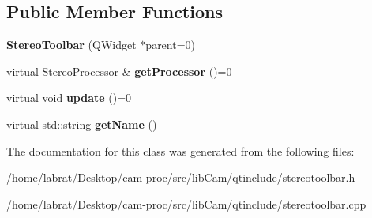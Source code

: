 \subsection*{Public Member Functions}
\begin{DoxyCompactItemize}
\item 
{\bfseries Stereo\+Toolbar} (Q\+Widget $\ast$parent=0)\hypertarget{classStereoToolbar_af6c618e6b46f1b8c743aa28cb2f89a55}{}\label{classStereoToolbar_af6c618e6b46f1b8c743aa28cb2f89a55}

\item 
virtual \hyperlink{classStereoProcessor}{Stereo\+Processor} \& {\bfseries get\+Processor} ()=0\hypertarget{classStereoToolbar_a46ac881df909595cc24beca9db9e0b47}{}\label{classStereoToolbar_a46ac881df909595cc24beca9db9e0b47}

\item 
virtual void {\bfseries update} ()=0\hypertarget{classStereoToolbar_a5a12fb71962a8a0c52a8f2644d6ee3f7}{}\label{classStereoToolbar_a5a12fb71962a8a0c52a8f2644d6ee3f7}

\item 
virtual std\+::string {\bfseries get\+Name} ()\hypertarget{classStereoToolbar_a93145ec7bcd19be35d975efd9ade2f04}{}\label{classStereoToolbar_a93145ec7bcd19be35d975efd9ade2f04}

\end{DoxyCompactItemize}


The documentation for this class was generated from the following files\+:\begin{DoxyCompactItemize}
\item 
/home/labrat/\+Desktop/cam-\/proc/src/lib\+Cam/qtinclude/stereotoolbar.\+h\item 
/home/labrat/\+Desktop/cam-\/proc/src/lib\+Cam/qtinclude/stereotoolbar.\+cpp\end{DoxyCompactItemize}
